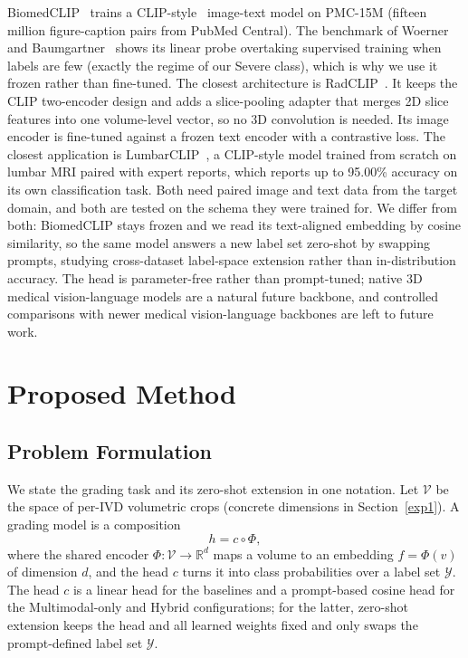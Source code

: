 \documentclass[runningheads]{llncs}
\begin{document}
BiomedCLIP~\cite{zhang2023biomedclip} trains a CLIP-style~\cite{radford2021clip} image-text model on PMC-15M (fifteen million figure-caption pairs from PubMed Central). The benchmark of Woerner and Baumgartner~\cite{datascarcity2024} shows its linear probe overtaking supervised training when labels are few (exactly the regime of our Severe class), which is why we use it frozen rather than fine-tuned. The closest architecture is RadCLIP~\cite{lu2024radclip}. It keeps the CLIP two-encoder design and adds a slice-pooling adapter that merges 2D slice features into one volume-level vector, so no 3D convolution is needed. Its image encoder is fine-tuned against a frozen text encoder with a contrastive loss. The closest application is LumbarCLIP~\cite{le2025lumbarclip}, a CLIP-style model trained from scratch on lumbar MRI paired with expert reports, which reports up to 95.00\% accuracy on its own classification task. Both need paired image and text data from the target domain, and both are tested on the schema they were trained for. We differ from both: BiomedCLIP stays frozen and we read its text-aligned embedding by cosine similarity, so the same model answers a new label set zero-shot by swapping prompts, studying cross-dataset label-space extension rather than in-distribution accuracy. The head is parameter-free rather than prompt-tuned; native 3D medical vision-language models are a natural future backbone, and controlled comparisons with newer medical vision-language backbones are left to future work.

\section{Proposed Method}\label{sec3}

\subsection{Problem Formulation}\label{sec:formulation}

We state the grading task and its zero-shot extension in one notation. Let $\mathcal{V}$ be the space of per-IVD volumetric crops (concrete dimensions in Section~\ref{exp1}). A grading model is a composition
\begin{equation}
h = c \circ \Phi,
\label{eq:composition}
\end{equation}
where the shared encoder $\Phi:\mathcal{V}\to\mathbb{R}^{d}$ maps a volume to an embedding $f=\Phi(v)$ of dimension $d$, and the head $c$ turns it into class probabilities over a label set $\mathcal{Y}$. The head $c$ is a linear head for the baselines and a prompt-based cosine head for the Multimodal-only and Hybrid configurations; for the latter, zero-shot extension keeps the head and all learned weights fixed and only swaps the prompt-defined label set $\mathcal{Y}$.
\end{document}
